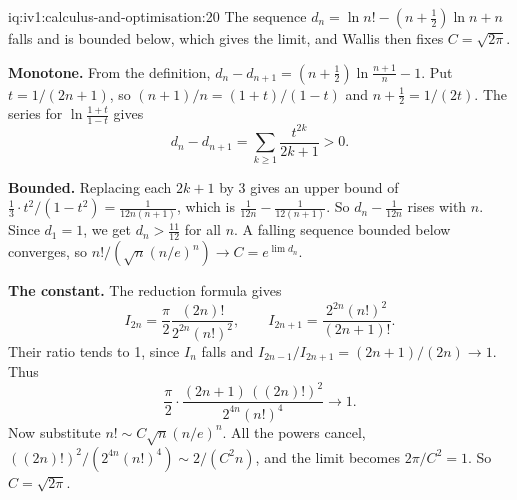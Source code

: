 \begin{solution}{iq:iv1:calculus-and-optimisation:20}
The sequence $d_n = \ln n! - (n + \frac12)\ln n + n$ falls and is bounded below, which gives the limit, and Wallis then fixes $C = \sqrt{2\pi}$.

\textbf{Monotone.} From the definition, $d_n - d_{n + 1} = (n + \frac12)\ln\frac{n + 1}{n} - 1$. Put $t = 1/(2n + 1)$, so $(n + 1)/n = (1 + t)/(1 - t)$ and $n + \frac12 = 1/(2t)$. The series for $\ln\frac{1 + t}{1 - t}$ gives
\[
d_n - d_{n + 1} = \sum_{k \ge 1}\frac{t^{2k}}{2k + 1} > 0.
\]

\textbf{Bounded.} Replacing each $2k + 1$ by 3 gives an upper bound of $\frac13\cdot t^2/(1 - t^2) = \frac{1}{12n(n + 1)}$, which is $\frac{1}{12n} - \frac{1}{12(n + 1)}$. So $d_n - \frac{1}{12n}$ rises with $n$. Since $d_1 = 1$, we get $d_n > \frac{11}{12}$ for all $n$. A falling sequence bounded below converges, so $n!/(\sqrt{n}(n/e)^n) \to C = e^{\lim d_n}$.

\textbf{The constant.} The reduction formula gives
\[
I_{2n} = \frac{\pi}{2}\frac{(2n)!}{2^{2n}(n!)^2}, \qquad I_{2n + 1} = \frac{2^{2n}(n!)^2}{(2n + 1)!}.
\]
Their ratio tends to 1, since $I_n$ falls and $I_{2n - 1}/I_{2n + 1} = (2n + 1)/(2n) \to 1$. Thus
\[
\frac{\pi}{2}\cdot\frac{(2n + 1)\,((2n)!)^2}{2^{4n}(n!)^4} \to 1.
\]
Now substitute $n! \sim C\sqrt{n}(n/e)^n$. All the powers cancel, $((2n)!)^2/(2^{4n}(n!)^4) \sim 2/(C^2n)$, and the limit becomes $2\pi/C^2 = 1$. So $C = \sqrt{2\pi}$.



\end{solution}
